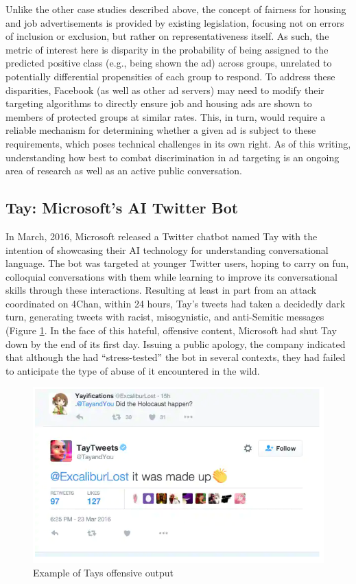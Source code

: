 \documentclass[]{krantz}
\begin{document}
Unlike the other case studies described above, the concept of fairness
for housing and job advertisements is provided by existing legislation,
focusing not on errors of inclusion or exclusion, but rather on
representativeness itself. As such, the metric of interest here is
disparity in the probability of being assigned to the predicted positive
class (e.g., being shown the ad) across groups, unrelated to potentially
differential propensities of each group to respond. To address these
disparities, Facebook (as well as other ad servers) may need to modify
their targeting algorithms to directly ensure job and housing ads are
shown to members of protected groups at similar rates. This, in turn,
would require a reliable mechanism for determining whether a given ad is
subject to these requirements, which poses technical challenges in its
own right. As of this writing, understanding how best to combat
discrimination in ad targeting is an ongoing area of research as well as
an active public conversation.

\subsection{Tay: Microsoft's AI Twitter
Bot}\label{tay-microsofts-ai-twitter-bot}

In March, 2016, Microsoft released a Twitter chatbot named Tay with the
intention of showcasing their AI technology for understanding
conversational language. The bot was targeted at younger Twitter users,
hoping to carry on fun, colloquial conversations with them while
learning to improve its conversational skills through these
interactions. Resulting at least in part from an attack coordinated on
4Chan, within 24 hours, Tay's tweets had taken a decidedly dark turn,
generating tweets with racist, misogynistic, and anti-Semitic messages
(Figure \ref{fig:taytweets}. In the face of this hateful, offensive
content, Microsoft had shut Tay down by the end of its first day.
Issuing a public apology, the company indicated that although the had
``stress-tested'' the bot in several contexts, they had failed to
anticipate the type of abuse of it encountered in the wild.

\begin{figure}

{\centering \includegraphics[width=0.8\linewidth]{ChapterBias/figures/tay_tweets2} 

}

\caption{Example of Tays offensive output}\label{fig:taytweets}
\end{figure}
\end{document}
